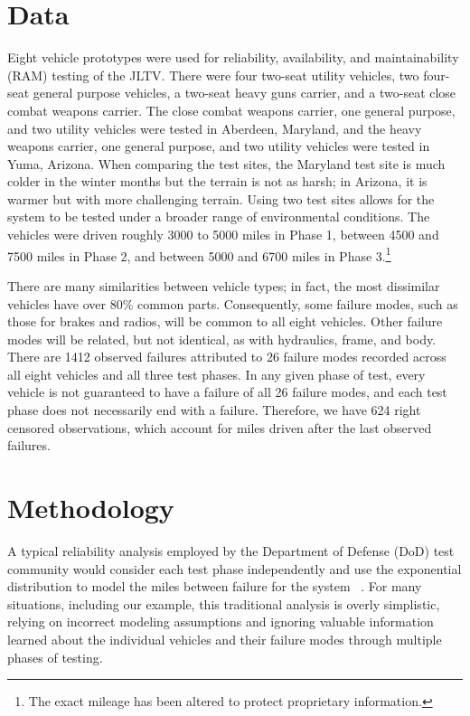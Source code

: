 \documentclass[12pt]{article}
\begin{document}
\section{Data}
Eight vehicle prototypes were used for reliability, availability, and maintainability (RAM) testing of the JLTV. There were four two-seat utility vehicles,
two four-seat general purpose vehicles, a two-seat heavy guns carrier, and a
two-seat close combat weapons carrier. The close combat weapons carrier, one
general purpose, and two utility vehicles were tested in Aberdeen, Maryland, and the heavy weapons carrier, one general purpose, and two utility vehicles
were tested in Yuma, Arizona. When comparing the test sites, the Maryland test site is much colder in the winter months but the terrain is not as harsh; in Arizona, it is warmer but with more challenging terrain. Using two test sites allows for the system to be tested under a broader range of environmental conditions.
The vehicles were driven roughly 3000 to 5000 miles in Phase 1, between
4500 and 7500 miles in Phase 2, and between 5000 and 6700 miles in Phase
3.\footnote{The exact mileage has been altered to protect proprietary information.}

There are many similarities between vehicle types; in fact, the most dissimilar
vehicles have over 80\% common parts. Consequently, some failure modes, such as those for
brakes and radios, will be common to all eight vehicles. Other failure modes
will be related, but not identical, as with hydraulics, frame, and body. There are 1412 observed failures attributed to 26 failure modes recorded across
all eight vehicles and all three test phases. In any given phase of test, every
vehicle is not guaranteed to have a failure of all 26 failure modes, and each
test phase does not necessarily end with a failure. Therefore, we have 624 right
censored observations, which account for miles driven after the last observed failures.

\section{Methodology}
A typical reliability analysis employed by the Department of Defense (DoD) test
community would consider each test phase independently and use the exponential
distribution to model the miles between failure for the system ~\cite{ref1}. For many situations, including our example, this
traditional analysis is overly simplistic, relying on incorrect modeling assumptions and ignoring valuable information learned about the individual vehicles and their failure modes through multiple phases of testing.
\end{document}
